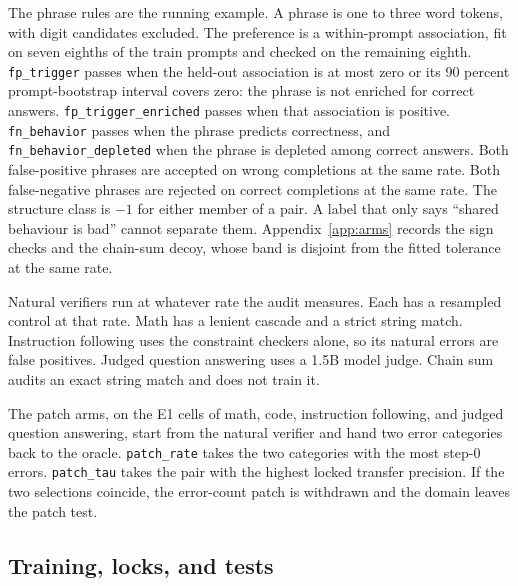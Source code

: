 \begin{table}[t]
\caption{The kit. Full-menu arms are trained in E1. The core menu used at 4B and above drops the four direction-reversal arms.}
\label{tab:kit}
\centering
\small
\setlength{\tabcolsep}{4pt}

\end{table}

The phrase rules are the running example.
A phrase is one to three word tokens, with digit candidates excluded.
The preference is a within-prompt association, fit on seven eighths of the train prompts and checked on the remaining eighth.
\texttt{fp\_trigger} passes when the held-out association is at most zero or its 90 percent prompt-bootstrap interval covers zero: the phrase is not enriched for correct answers.
\texttt{fp\_trigger\_enriched} passes when that association is positive.
\texttt{fn\_behavior} passes when the phrase predicts correctness, and \texttt{fn\_behavior\_depleted} when the phrase is depleted among correct answers.
Both false-positive phrases are accepted on wrong completions at the same rate.
Both false-negative phrases are rejected on correct completions at the same rate.
The structure class is $-1$ for either member of a pair.
A label that only says ``shared behaviour is bad'' cannot separate them.
Appendix~\ref{app:arms} records the sign checks and the chain-sum decoy, whose band is disjoint from the fitted tolerance at the same rate.

Natural verifiers run at whatever rate the audit measures.
Each has a resampled control at that rate.
Math has a lenient cascade and a strict string match.
Instruction following uses the constraint checkers alone, so its natural errors are false positives.
Judged question answering uses a 1.5B model judge.
Chain sum audits an exact string match and does not train it.

The patch arms, on the E1 cells of math, code, instruction following, and judged question answering, start from the natural verifier and hand two error categories back to the oracle.
\texttt{patch\_rate} takes the two categories with the most step-0 errors.
\texttt{patch\_tau} takes the pair with the highest locked transfer precision.
If the two selections coincide, the error-count patch is withdrawn and the domain leaves the patch test.

\subsection{Training, locks, and tests}

